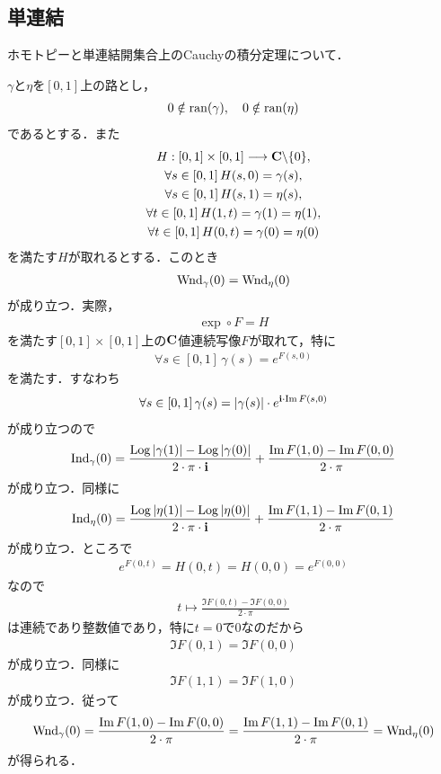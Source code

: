 \subsection{単連結}
	ホモトピーと単連結開集合上のCauchyの積分定理について．
	
	$\gamma$と$\eta$を$[0,1]$上の路とし，
	\begin{align}
		0 \notin \operatorname*{ran} (\gamma),\quad 0 \notin \operatorname*{ran} (\eta)
	\end{align}
	であるとする．また
	\begin{align}
		\begin{gathered}
		H:[0,1] \times [0,1] \longrightarrow \mathbf{C} \backslash \{0\}, \\
		\forall s \in [0,1]\, H(s,0) = \gamma(s), \\
		\forall s \in [0,1]\, H(s,1) = \eta(s), \\
		\forall t \in [0,1]\, H(1,t) = \gamma(1) = \eta(1), \\
		\forall t \in [0,1]\, H(0,t) = \gamma(0) = \eta(0)
		\end{gathered}
	\end{align}
	を満たす$H$が取れるとする．このとき
	\begin{align}
		\operatorname{Wnd}_{\gamma}(0) = \operatorname{Wnd}_{\eta}(0)
	\end{align}
	が成り立つ．実際，
	\begin{align}
		\exp \circ F = H
	\end{align}
	を満たす$[0,1] \times [0,1]$上の$\mathbf{C}$値連続写像$F$が取れて，特に
	\begin{align}
		\forall s \in [0,1]\, \gamma(s) = e^{F(s,0)}
	\end{align}
	を満たす．すなわち
	\begin{align}
		\forall s \in [0,1]\, \gamma(s) = |\gamma(s)| \cdot e^{\mathbf{i} \cdot \operatorname{Im} F(s,0)}
	\end{align}
	が成り立つので
	\begin{align}
		\operatorname{Ind}_{\gamma}(0)
		= \frac{\operatorname{Log}{|\gamma(1)|} - \operatorname{Log}{|\gamma(0)|}}{2\cdot\pi\cdot\mathbf{i}}
		+ \frac{\operatorname{Im} F(1,0) - \operatorname{Im} F(0,0)}{2\cdot\pi}
	\end{align}
	が成り立つ．同様に
	\begin{align}
		\operatorname{Ind}_{\eta}(0)
		= \frac{\operatorname{Log}{|\eta(1)|} - \operatorname{Log}{|\eta(0)|}}{2\cdot\pi\cdot\mathbf{i}}
		+ \frac{\operatorname{Im} F(1,1) - \operatorname{Im} F(0,1)}{2\cdot\pi}
	\end{align}
	が成り立つ．ところで
	\begin{align}
		e^{F(0,t)} = H(0,t) = H(0,0) = e^{F(0,0)}
	\end{align}
	なので
	\begin{align}
		t \longmapsto \frac{\Im{F(0,t)} - \Im{F(0,0)}}{2\cdot\pi}
	\end{align}
	は連続であり整数値であり，特に$t=0$で$0$なのだから
	\begin{align}
		\Im{F(0,1)} = \Im{F(0,0)}
	\end{align}
	が成り立つ．同様に
	\begin{align}
		\Im{F(1,1)} = \Im{F(1,0)}
	\end{align}
	が成り立つ．従って
	\begin{align}
		\operatorname{Wnd}_{\gamma}(0) = \frac{\operatorname{Im} F(1,0) - \operatorname{Im} F(0,0)}{2\cdot\pi}
		= \frac{\operatorname{Im} F(1,1) - \operatorname{Im} F(0,1)}{2\cdot\pi}
		= \operatorname{Wnd}_{\eta}(0)
	\end{align}
	が得られる．
	